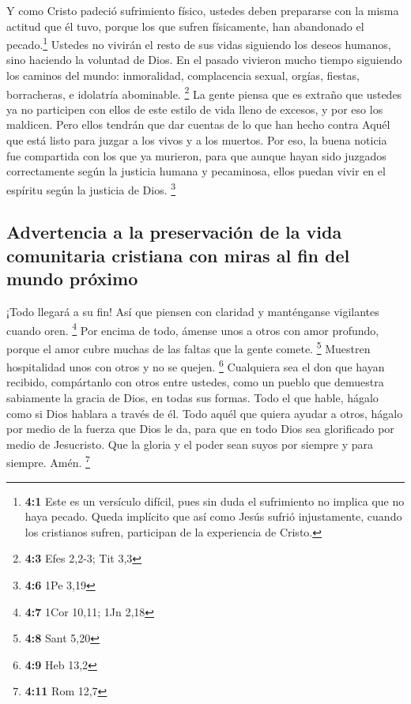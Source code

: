  Y como Cristo padeció sufrimiento físico, ustedes deben
prepararse con la misma actitud que él tuvo, porque los que sufren
físicamente, han abandonado el pecado.\footnote{\textbf{4:1} Este es un
  versículo difícil, pues sin duda el sufrimiento no implica que no haya
  pecado. Queda implícito que así como Jesús sufrió injustamente, cuando
  los cristianos sufren, participan de la experiencia de Cristo.}
 Ustedes no vivirán el resto de sus vidas siguiendo los
deseos humanos, sino haciendo la voluntad de Dios.  En el
pasado vivieron mucho tiempo siguiendo los caminos del mundo:
inmoralidad, complacencia sexual, orgías, fiestas, borracheras, e
idolatría abominable. \footnote{\textbf{4:3} Efes 2,2-3; Tit 3,3}
 La gente piensa que es extraño que ustedes ya no
participen con ellos de este estilo de vida lleno de excesos, y por eso
los maldicen. Pero ellos tendrán que dar cuentas de lo que han hecho
contra Aquél que está listo para juzgar a los vivos y a los muertos.
 Por eso, la buena noticia fue compartida con los que ya
murieron,  para que aunque hayan sido juzgados
correctamente según la justicia humana y pecaminosa, ellos puedan vivir
en el espíritu según la justicia de Dios. \footnote{\textbf{4:6} 1Pe
  3,19}

\hypertarget{advertencia-a-la-preservaciuxf3n-de-la-vida-comunitaria-cristiana-con-miras-al-fin-del-mundo-pruxf3ximo}{%
\subsection{Advertencia a la preservación de la vida comunitaria
cristiana con miras al fin del mundo
próximo}\label{advertencia-a-la-preservaciuxf3n-de-la-vida-comunitaria-cristiana-con-miras-al-fin-del-mundo-pruxf3ximo}}

 ¡Todo llegará a su fin! Así que piensen con claridad y
manténganse vigilantes cuando oren. \footnote{\textbf{4:7} 1Cor 10,11;
  1Jn 2,18}  Por encima de todo, ámense unos a otros con
amor profundo, porque el amor cubre muchas de las faltas que la gente
comete. \footnote{\textbf{4:8} Sant 5,20}  Muestren
hospitalidad unos con otros y no se quejen. \footnote{\textbf{4:9} Heb
  13,2}  Cualquiera sea el don que hayan recibido,
compártanlo con otros entre ustedes, como un pueblo que demuestra
sabiamente la gracia de Dios, en todas sus formas.  Todo
el que hable, hágalo como si Dios hablara a través de él. Todo aquél que
quiera ayudar a otros, hágalo por medio de la fuerza que Dios le da,
para que en todo Dios sea glorificado por medio de Jesucristo. Que la
gloria y el poder sean suyos por siempre y para siempre. Amén.
\footnote{\textbf{4:11} Rom 12,7}

